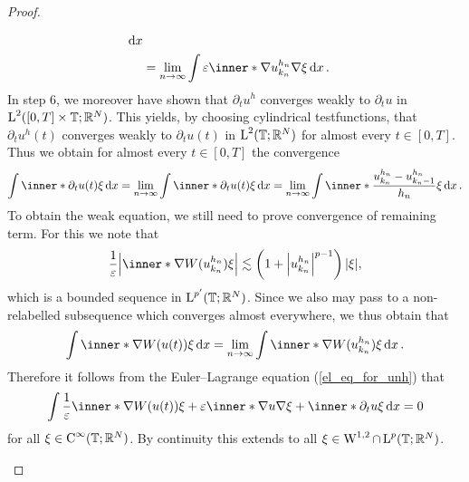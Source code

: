 \begin{proof}
\begin{description}[wide=0pt]
\begin{align*}
			\dd{x }
		\\
		& = 
		\lim_{ n \to \infty }
			\int
				\varepsilon
				\inner*{ \nabla u_{ k_{ n } }^{ h_{ n } } }{ \nabla \xi }
			\dd{ x }.
	\end{align*}
	In step 6, we moreover have shown that $ \partial_{ t } u^{ h } $ converges weakly to $ \partial_{t } u $ in $ \operatorname{L}^{ 2 } ( [ 0, T ] \times \operatorname{\mathbb{T}} ; \mathbb{ R }^{ N } ) $. This yields, by choosing cylindrical testfunctions, that $ \partial_{ t } u^{ h } ( t ) $ converges weakly to $ \partial_{ t } u ( t ) $ in $ \operatorname{L}^{ 2 } ( \operatorname{\mathbb{T}} ; \mathbb{ R }^{ N } ) $ for almost every $ t \in [ 0 , T ] $.
	Thus we obtain for almost every $ t\in [ 0 , T ] $ the convergence
	\begin{equation*}
		\int
			\inner*{ \partial_{ t } u ( t ) }{ \xi }
		\dd{ x }
		=
		\lim_{ n \to \infty }
			\int
				\inner*{ \partial_{ t } u ( t ) }{ \xi }
			\dd{ x }
		=
		\lim_{ n \to \infty }
			 \int
			 	\inner*{ \frac{ u_{ k_{ n } }^{ h_{ n } } - u_{ k_{ n } - 1 }^{ h_{ n } } }{ h_{ n } } }{ \xi }
			 \dd{ x }.
	\end{equation*}
	To obtain the weak equation, we still need to prove convergence of remaining term. For this we note that 
	\begin{equation*}
		\frac{ 1 }{ \varepsilon }
		\abs{ \inner*{ \nabla W ( u_{ k_{ n } }^{ h_{ n } } ) }{ \xi } }
		\lesssim
		\left( 1 + \abs{ u_{  k_{ n } }^{ h_{ n } } }^{ p - 1 } \right) \abs{ \xi },
	\end{equation*}
	which is a bounded sequence in $ \operatorname{L}^{ p'} ( \operatorname{\mathbb{T}} ; \mathbb{ R }^{ N } ) $. Since we also may pass to a non-relabelled subsequence which converges almost everywhere, we thus obtain that
	\begin{equation*}
		\int
			\inner*{ \nabla W ( u ( t ) ) }{ \xi } 
		\dd{ x }
		=
		\lim_{ n \to \infty }
			\int
				\inner*{ \nabla W ( u_{ k_{ n } }^{ h_{ n } } ) }{ \xi }
			\dd{ x }.
	\end{equation*}
	Therefore it follows from the Euler--Lagrange equation (\ref{el_eq_for_unh}) that
	\begin{equation*}
		\int
			\frac{ 1 }{ \varepsilon }
			\inner*{ \nabla W ( u ( t )) }{ \xi }
			+
			\varepsilon
			\inner*{ \nabla u }{ \nabla \xi }
			+
			\inner*{ \partial_{ t } u }{ \xi }
		\dd{ x }
		=
		0
	\end{equation*}
	for all $ \xi \in \operatorname{C}^{ \infty } ( \operatorname{\mathbb{T}} ; \mathbb{ R }^{ N } ) $. By continuity this extends to all $ \xi \in \operatorname{W}^{ 1 , 2 } \cap \operatorname{L}^{ p } ( \mathbb{ T } ; \mathbb{ R }^{ N } ) $.
	

\end{description}
\end{proof}
